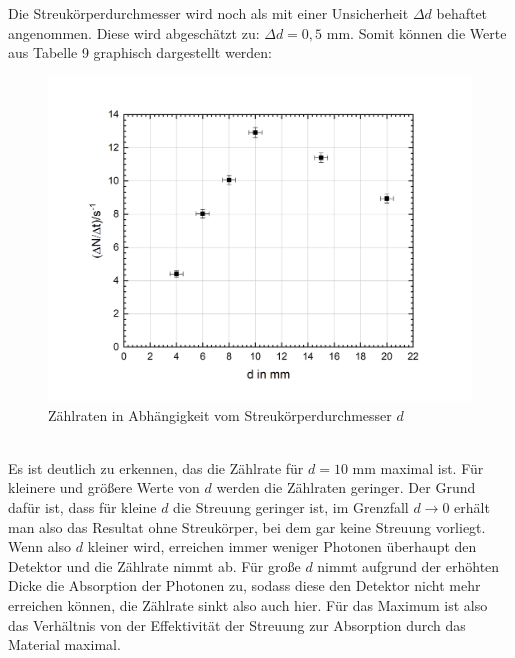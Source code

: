 \documentclass[german,  %
parskip=full,  %
]{scrartcl}
\begin{document}
Die Streukörperdurchmesser wird noch als mit einer Unsicherheit $\Delta d$ behaftet angenommen. Diese wird abgeschätzt zu: $\Delta d = 0,5 $ mm.
\newpage
Somit können die Werte aus Tabelle 9 graphisch dargestellt werden:
\begin{figure}[h!]\centering
\includegraphics[scale=0.5]{durchmesser}
\caption{Zählraten in Abhängigkeit vom Streukörperdurchmesser $d$}
\end{figure}
\\
Es ist deutlich zu erkennen, das die Zählrate für $d=10$ mm maximal ist. Für kleinere und größere Werte von $d$ werden die Zählraten geringer. Der Grund dafür ist, dass für kleine $d$ die Streuung geringer ist, im Grenzfall $d \rightarrow 0$ erhält man also das Resultat ohne Streukörper, bei dem gar keine Streuung vorliegt. Wenn also $d$ kleiner wird, erreichen immer weniger Photonen überhaupt den Detektor und die Zählrate nimmt ab. Für große $d$ nimmt aufgrund der erhöhten Dicke die Absorption der Photonen zu, sodass diese den Detektor nicht mehr erreichen können, die Zählrate sinkt also auch hier. Für das Maximum ist also das Verhältnis von der Effektivität der Streuung zur Absorption durch das Material maximal.

\newpage
\end{document}
